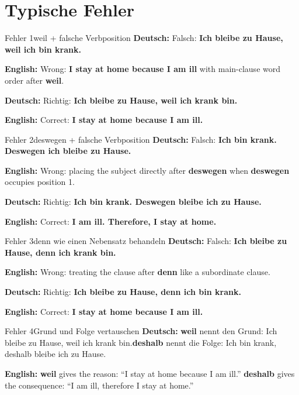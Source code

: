 \documentclass[a4paper,11pt]{article}
\newcommand{\GermanText}[1]{\textbf{Deutsch: }#1\par}
\newcommand{\EnglishText}[1]{{\small\color{SoftGray}\textbf{English: }#1\par}}
\begin{document}
    \section{Typische Fehler}

        \begin{grammarentry}{Fehler 1}{weil + falsche Verbposition}
            \GermanText{Falsch: \textbf{Ich bleibe zu Hause, weil ich bin krank.}}
            \EnglishText{Wrong: \textbf{I stay at home because I am ill} with main-clause word order after \textbf{weil}.}

            \GermanText{Richtig: \textbf{Ich bleibe zu Hause, weil ich krank bin.}}
            \EnglishText{Correct: \textbf{I stay at home because I am ill.}}
        \end{grammarentry}

        \begin{grammarentry}{Fehler 2}{deswegen + falsche Verbposition}
            \GermanText{Falsch: \textbf{Ich bin krank. Deswegen ich bleibe zu Hause.}}
            \EnglishText{Wrong: placing the subject directly after \textbf{deswegen} when \textbf{deswegen} occupies position 1.}

            \GermanText{Richtig: \textbf{Ich bin krank. Deswegen bleibe ich zu Hause.}}
            \EnglishText{Correct: \textbf{I am ill. Therefore, I stay at home.}}
        \end{grammarentry}

        \begin{grammarentry}{Fehler 3}{denn wie einen Nebensatz behandeln}
            \GermanText{Falsch: \textbf{Ich bleibe zu Hause, denn ich krank bin.}}
            \EnglishText{Wrong: treating the clause after \textbf{denn} like a subordinate clause.}

            \GermanText{Richtig: \textbf{Ich bleibe zu Hause, denn ich bin krank.}}
            \EnglishText{Correct: \textbf{I stay at home because I am ill.}}
        \end{grammarentry}

        \begin{grammarentry}{Fehler 4}{Grund und Folge vertauschen}
            \GermanText{\textbf{weil} nennt den Grund: \glqq Ich bleibe zu Hause, weil ich krank bin.\grqq \textbf{deshalb} nennt die Folge: \glqq Ich bin krank, deshalb bleibe ich zu Hause.\grqq}
            \EnglishText{\textbf{weil} gives the reason: ``I stay at home because I am ill.'' \textbf{deshalb} gives the consequence: ``I am ill, therefore I stay at home.''}
        \end{grammarentry}
\end{document}
